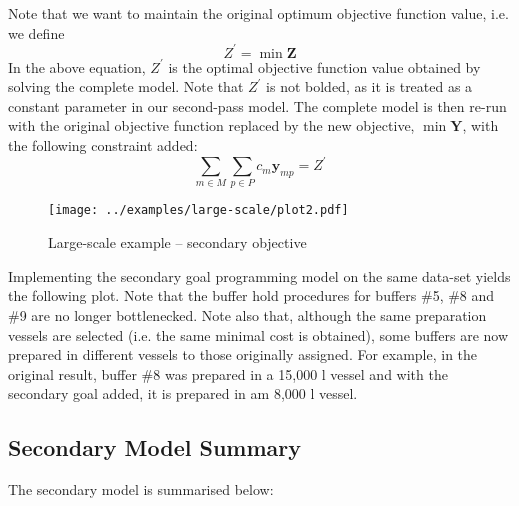 Note that we want to maintain the original optimum objective function value,
i.e. we define
\begin{equation}
    Z^{\prime} = \min \boldsymbol{Z}
\end{equation}
In the above equation, $Z^{\prime}$ is the optimal objective function value
obtained by solving the complete model.
Note that $Z^{\prime}$ is not bolded, as it is treated as a constant parameter
in our second-pass model.
The complete model is then re-run with the original objective function replaced
by the new objective, $\min \boldsymbol{Y}$, with the following constraint
added:
\begin{equation}
    \sum_{m \in M} \sum_{p \in P} c_m \boldsymbol{y}_{mp} = Z^{\prime}
    \label{eq.constr10}
\end{equation}
\begin{figure}
    \centering
    \texttt{[image: ../examples/large-scale/plot2.pdf]}
    \caption{Large-scale example -- secondary objective}
    \label{fig.secondary}
\end{figure}
Implementing the secondary goal programming model on the same data-set yields
the following plot.
Note that the buffer hold procedures for buffers \#5, \#8 and \#9 are no longer
bottlenecked.
Note also that, although the same preparation vessels are selected (i.e. the
same minimal cost is obtained), some buffers are now prepared in different
vessels to those originally assigned.
For example, in the original result, buffer \#8 was prepared in a 15,000 l
vessel and with the secondary goal added, it is prepared in am 8,000 l vessel.

\subsection{Secondary Model Summary}\label{SS.model2summary}

The secondary model is summarised below:


